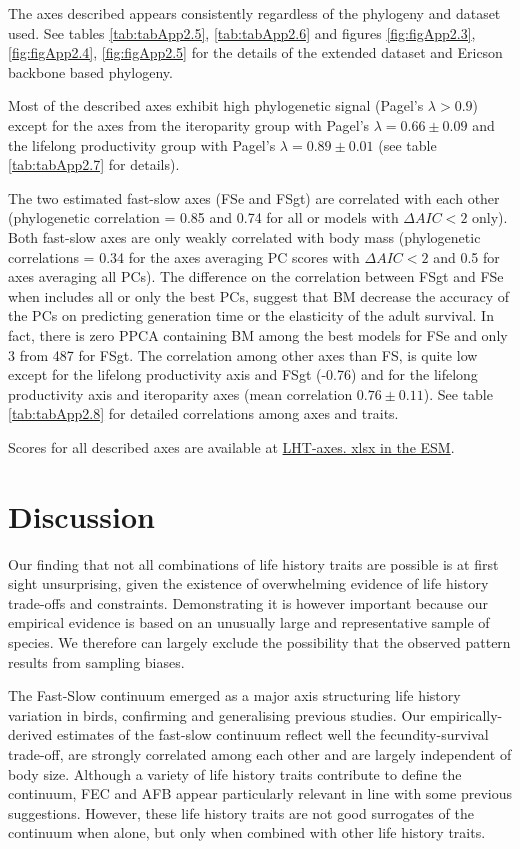 The axes described appears consistently regardless of the phylogeny and dataset
used. See tables \ref{tab:tabApp2.5}, \ref{tab:tabApp2.6} and figures
\ref{fig:figApp2.3}, \ref{fig:figApp2.4}, \ref{fig:figApp2.5} for the details of
the extended dataset and Ericson backbone based phylogeny.

Most of the described axes exhibit high phylogenetic signal (Pagel's
$\lambda > 0.9$) except for the axes from the iteroparity group with Pagel's
$\lambda = 0.66 \pm 0.09$ and the lifelong productivity group with Pagel's
$\lambda = 0.89 \pm 0.01$ (see table \ref{tab:tabApp2.7} for details).

The two estimated fast-slow axes (FSe and FSgt) are correlated with each
other (phylogenetic correlation =  0.85 and 0.74 for all or models with
$\Delta AIC < 2$ only). Both fast-slow axes are only weakly correlated with
body mass (phylogenetic correlations = 0.34 for the axes averaging PC
scores with $\Delta AIC < 2$ and 0.5 for axes averaging all PCs). The difference
on the correlation between FSgt and FSe when includes all or only the best PCs,
suggest that BM decrease the accuracy of the PCs on predicting generation time
or the elasticity of the adult survival. In fact, there is zero PPCA containing
BM among the best models for FSe and only 3 from 487 for FSgt. The correlation
among other axes than FS, is quite low except for the lifelong productivity axis
and FSgt (-0.76) and for the lifelong productivity axis and iteroparity axes
(mean correlation $0.76 \pm 0.11$). See table \ref{tab:tabApp2.8} for detailed
correlations among axes and traits.

Scores for all described axes are available at
\href{https://github.com/jmaspons/Thesis/tree/master/ESM/chapter02}{LHT-axes.
xlsx in the ESM}.


\section{Discussion}

Our finding that not all combinations of life history traits are possible is at 
first sight unsurprising, given the existence of overwhelming evidence of life 
history trade-offs and constraints. Demonstrating it is however important 
because our empirical evidence is based on an unusually large and representative 
sample of species. We therefore can largely exclude the possibility that the 
observed pattern results from sampling biases.

The Fast-Slow continuum emerged as a major axis structuring life history 
variation in birds, confirming and generalising previous studies. Our 
empirically-derived estimates of the fast-slow continuum reflect well the 
fecundity-survival trade-off, are strongly correlated among each other and are 
largely independent of body size. Although a variety of life history traits 
contribute to define the continuum, FEC and AFB appear particularly relevant in
line with some previous suggestions. However, these life history traits are not
good surrogates of the continuum when alone, but only when combined with other
life history traits.

